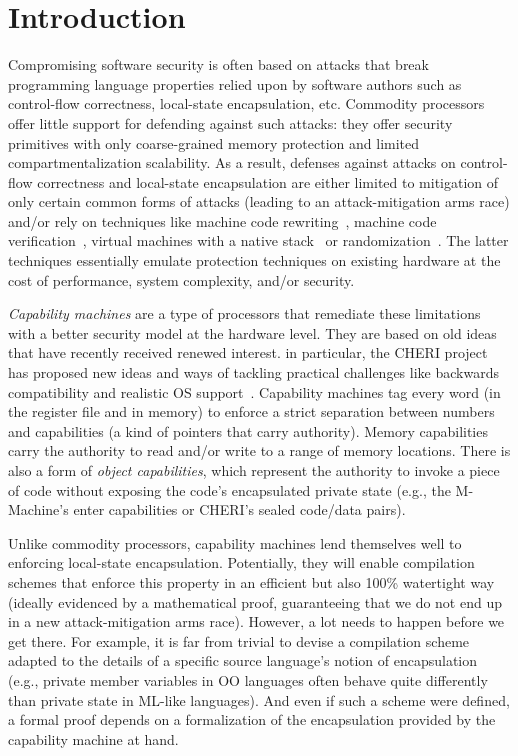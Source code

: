 \documentclass[format=acmsmall, review=true, screen=true]{acmart}
\begin{document}
\section{Introduction}
\label{sec:introduction}

Compromising software security is often based on attacks that break programming language properties relied upon by software authors such as control-flow correctness, local-state encapsulation, etc.
Commodity processors offer little support for defending against such attacks: they offer security primitives with only coarse-grained memory protection and limited compartmentalization scalability.
As a result, defenses against attacks on control-flow correctness and local-state encapsulation are either limited to mitigation of only certain common forms of attacks (leading to an attack-mitigation arms race) and/or rely on techniques like machine code rewriting~\citep{wahbe_efficient_1993,abadi_control-flow_2005}, machine code verification~\citep{morrisett_system_1999}, virtual machines with a native stack~\citep{lindholm_java_2014} or randomization~\citep{forrest_building_1997}.
The latter techniques essentially emulate protection techniques on existing hardware at the cost of performance, system complexity, and/or security.

\emph{Capability machines} are a type of processors that
remediate these limitations with a better security model at
the hardware level. They are based on old
ideas~\citep{Carter:1994:HSF:195473.195579,Dennis:1966:PSM:365230.365252,shapiro_eros:_1999} that
 have recently received renewed interest. in particular, the CHERI
project has proposed new ideas and ways of tackling practical
challenges like backwards compatibility and realistic OS
support~\citep{Watson2015Cheri,Woodruff:2014:CCM:2665671.2665740}. Capability
machines tag every word (in the register file and in memory) to
enforce a strict separation between numbers and capabilities (a kind
of pointers that carry authority). Memory capabilities carry
the authority to read and/or write to a range of memory
locations. There is also a form of \emph{object capabilities}, which represent the
authority to invoke a piece of code without exposing the code's
encapsulated private state (e.g., the M-Machine's enter capabilities or
CHERI's sealed code/data pairs).

Unlike commodity processors, capability machines lend themselves well to
enforcing local-state encapsulation. Potentially, they will enable compilation
schemes that enforce this property in an efficient but also 100\% watertight way
(ideally evidenced by a mathematical proof, guaranteeing that we do not end up
in a new attack-mitigation arms race). However, a lot needs to happen before we get
there. For example, it is far from trivial to devise a compilation scheme
adapted to the details of a specific source language's notion of encapsulation
(e.g., private member variables in OO languages often behave quite differently
than private state in ML-like languages). And even if such a scheme were
defined, a formal proof depends on a formalization of the encapsulation provided
by the capability machine at hand.
\end{document}
